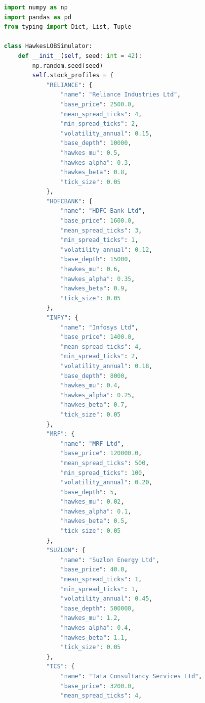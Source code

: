 \documentclass[11pt,a4paper]{article}
\begin{document}
\begin{lstlisting}[language=Python, caption=Complete Hawkes-based Limit Order Book Simulator Class]
import numpy as np
import pandas as pd
from typing import Dict, List, Tuple

class HawkesLOBSimulator:
    def __init__(self, seed: int = 42):
        np.random.seed(seed)
        self.stock_profiles = {
            "RELIANCE": {
                "name": "Reliance Industries Ltd",
                "base_price": 2500.0,
                "mean_spread_ticks": 4,
                "min_spread_ticks": 2,
                "volatility_annual": 0.15,
                "base_depth": 10000,
                "hawkes_mu": 0.5,
                "hawkes_alpha": 0.3,
                "hawkes_beta": 0.8,
                "tick_size": 0.05
            },
            "HDFCBANK": {
                "name": "HDFC Bank Ltd",
                "base_price": 1600.0,
                "mean_spread_ticks": 3,
                "min_spread_ticks": 1,
                "volatility_annual": 0.12,
                "base_depth": 15000,
                "hawkes_mu": 0.6,
                "hawkes_alpha": 0.35,
                "hawkes_beta": 0.9,
                "tick_size": 0.05
            },
            "INFY": {
                "name": "Infosys Ltd",
                "base_price": 1400.0,
                "mean_spread_ticks": 4,
                "min_spread_ticks": 2,
                "volatility_annual": 0.18,
                "base_depth": 8000,
                "hawkes_mu": 0.4,
                "hawkes_alpha": 0.25,
                "hawkes_beta": 0.7,
                "tick_size": 0.05
            },
            "MRF": {
                "name": "MRF Ltd",
                "base_price": 120000.0,
                "mean_spread_ticks": 500,
                "min_spread_ticks": 100,
                "volatility_annual": 0.20,
                "base_depth": 5,
                "hawkes_mu": 0.02,
                "hawkes_alpha": 0.1,
                "hawkes_beta": 0.5,
                "tick_size": 0.05
            },
            "SUZLON": {
                "name": "Suzlon Energy Ltd",
                "base_price": 40.0,
                "mean_spread_ticks": 1,
                "min_spread_ticks": 1,
                "volatility_annual": 0.45,
                "base_depth": 500000,
                "hawkes_mu": 1.2,
                "hawkes_alpha": 0.4,
                "hawkes_beta": 1.1,
                "tick_size": 0.05
            },
            "TCS": {
                "name": "Tata Consultancy Services Ltd",
                "base_price": 3200.0,
                "mean_spread_ticks": 4,

\end{lstlisting}
\end{document}
